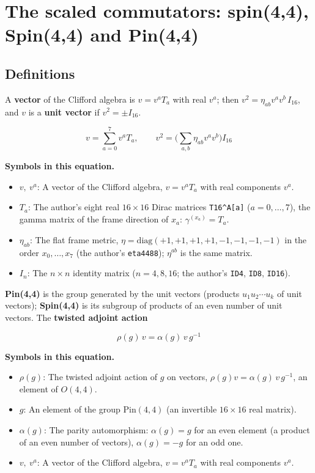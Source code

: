 \documentclass[
  10pt,
]{article}
\providecommand{\tightlist}{%
  \setlength{\itemsep}{0pt}\setlength{\parskip}{0pt}}
\begin{document}
\hypertarget{the-scaled-commutators-spin44-spin44-and-pin44}{%
\section{The scaled commutators: spin(4,4), Spin(4,4) and
Pin(4,4)}\label{the-scaled-commutators-spin44-spin44-and-pin44}}

\hypertarget{definitions}{%
\subsection{Definitions}\label{definitions}}

A \textbf{vector} of the Clifford algebra is \(v = v^aT_a\) with real
\(v^a\); then \(v^2 = \eta_{ab}v^av^b\,I_{16}\), and \(v\) is a
\textbf{unit vector} if \(v^2 = \pm I_{16}\).

\[
v = \sum_{a=0}^{7}v^aT_a,\qquad v^2 = \Big(\sum_{a,b}\eta_{ab}v^av^b\Big)I_{16}
\]

\textbf{Symbols in this equation.}

\begin{itemize}
\tightlist
\item
  \(v,\ v^a\): A vector of the Clifford algebra, \(v = v^a T_a\) with
  real components \(v^a\).
\item
  \(T_a\): The author's eight real \(16 \times 16\) Dirac matrices
  \texttt{T16\^{}A{[}a{]}} (\(a = 0, \dots, 7\)), the gamma matrix of
  the frame direction of \(x_a\): \(\gamma^{(x_a)} = T_a\).
\item
  \(\eta_{ab}\): The flat frame metric,
  \(\eta = \mathrm{diag}(+1, +1, +1, +1, -1, -1, -1, -1)\) in the order
  \(x_0, \dots, x_7\) (the author's \texttt{eta4488}); \(\eta^{ab}\) is
  the same matrix.
\item
  \(I_n\): The \(n \times n\) identity matrix (\(n = 4, 8, 16\); the
  author's \texttt{ID4}, \texttt{ID8}, \texttt{ID16}).
\end{itemize}

\textbf{Pin(4,4)} is the group generated by the unit vectors (products
\(u_1u_2\cdots u_k\) of unit vectors); \textbf{Spin(4,4)} is its
subgroup of products of an even number of unit vectors. The
\textbf{twisted adjoint action}

\[
\rho(g)\,v = \alpha(g)\,v\,g^{-1}
\]

\textbf{Symbols in this equation.}

\begin{itemize}
\tightlist
\item
  \(\rho(g)\): The twisted adjoint action of \(g\) on vectors,
  \(\rho(g)v = \alpha(g)\,v\,g^{-1}\), an element of \(O(4,4)\).
\item
  \(g\): An element of the group \(\mathrm{Pin}(4,4)\) (an invertible
  \(16 \times 16\) real matrix).
\item
  \(\alpha(g)\): The parity automorphism: \(\alpha(g) = g\) for an even
  element (a product of an even number of vectors), \(\alpha(g) = -g\)
  for an odd one.
\item
  \(v,\ v^a\): A vector of the Clifford algebra, \(v = v^a T_a\) with
  real components \(v^a\).
\end{itemize}
\end{document}
